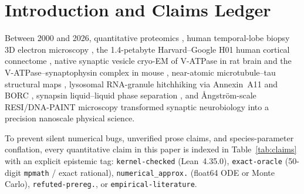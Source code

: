 \documentclass[11pt,letterpaper]{amsart}
\begin{document}
\maketitle

\section{Introduction and Claims Ledger}

Between 2000 and 2026, quantitative proteomics \cite{wilhelm2014composition}, human temporal-lobe biopsy 3D electron microscopy \cite{yakoubi2019layer4,rollenhagen2020human,rollenhagen2024l1}, the 1.4-petabyte Harvard--Google H01 human cortical connectome \cite{shapsoncoe2024h01}, native synaptic vesicle cryo-EM of V-ATPase in rat brain \cite{coupland2024vatpase} and the V-ATPase--synaptophysin complex in mouse \cite{wang2024vatpase}, near-atomic microtubule--tau structural maps \cite{kellogg2018tau}, lysosomal RNA-granule hitchhiking via Annexin~A11 and BORC \cite{liao2019anxa11,depace2024borc}, synapsin liquid--liquid phase separation \cite{milovanovic2018llps}, and \AA{}ngstr\"om-scale RESI/DNA-PAINT microscopy \cite{reinhardt2023resi} transformed synaptic neurobiology into a precision nanoscale physical science.

To prevent silent numerical bugs, unverified prose claims, and species-parameter conflation, every quantitative claim in this paper is indexed in Table~\ref{tab:claims} with an explicit epistemic tag: \texttt{kernel-checked} (Lean~4.35.0), \texttt{exact-oracle} (50-digit \texttt{mpmath} / exact rational), \texttt{numerical\_approx.} (float64 ODE or Monte Carlo), \texttt{refuted-prereg.}, or \texttt{empirical-literature}.
\end{document}
